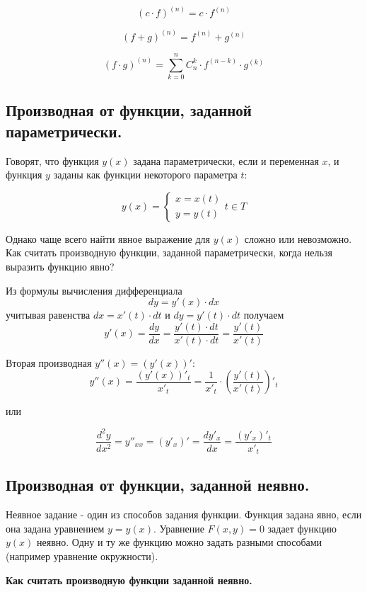 \documentclass[a4paper,12pt]{article}
\theoremstyle{plain} %
\theoremstyle{definition} %
\theoremstyle{remark} %
\begin{document}
\[
	(c \cdot f)^{(n)} = c \cdot f^{(n)}
\]

\[
	(f + g)^{(n)} = f^{(n)} + g^{(n)}
\]

\[
	(f \cdot g)^{(n)} = \sum_{k = 0}^{n} C_n^k \cdot f^{(n-k)} \cdot g^{(k)}
\]


\newpage
\subsection*{Производная от функции, заданной параметрически.}

Говорят, что функция $y(x)$ задана параметрически, если и переменная $x$, и функция $y$ заданы как функции некоторого параметра $t$:

\[
	y(x) =
	\begin{cases}
		x = x(t) \\
		y = y(t)
	\end{cases} t\in T
\]

Однако чаще всего найти явное выражение для $y(x)$ сложно или невозможно. Как считать производную функции, заданной параметрически, когда нельзя выразить функцию явно?

Из формулы вычисления дифференциала \[ dy = y'(x) \cdot dx \] учитывая равенства $ dx = x'(t) \cdot dt $ и $ dy = y'(t) \cdot dt $ получаем \[ y'(x) = \frac{dy}{dx} = \frac{y'(t) \cdot dt}{x'(t) \cdot dt} = \frac{y'(t)}{x'(t)} \]

Вторая производная $y''(x) = (y'(x))'$:
\[
	y''(x) = \frac{(y'(x))'_t}{x'_t} = \frac{1}{x'_t} \cdot \left( \frac{y'(t)}{x'(t)} \right)'_t
\]

или

\[
	\frac{d^2y}{dx^2} = y''_{xx} = (y'_x)' = \frac{dy'_x}{dx} = \frac{(y'_x)'_t}{x'_t}
\]

\newpage
\subsection*{Производная от функции, заданной неявно.                                                   }

Неявное задание - один из способов задания функции. Функция задана явно, если она задана уравнением $y = y(x)$. Уравнение $F(x, y) = 0$ задает функцию $y(x)$ неявно. Одну и ту же функцию можно задать разными способами (например уравнение окружности).

\textbf{Как считать производную функции заданной неявно.}
\end{document}
